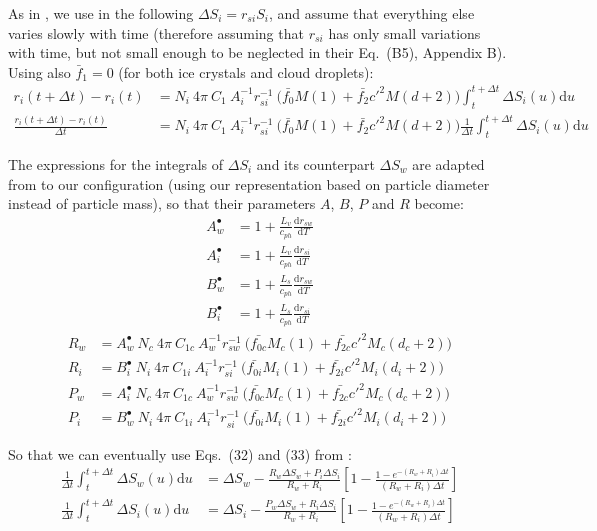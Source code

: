 As in \citet{Reisin1996}, we use in the following $\Delta S_i = r_{si} S_i$, and assume that everything else varies slowly with time (therefore assuming that $r_{si}$ has only small variations with time, but not small enough to be neglected in their Eq.\ (B5), Appendix B). Using also $\bar{f}_1=0$ (for both ice crystals and cloud droplets):
\begin{align}
 r_i(t + \Delta t) - r_i(t) &= N_i ~ 4\pi ~ C_1 ~ A_i^{-1} r_{si}^{-1} ~ \Bigg( \bar{f_0} M(1) + \bar{f_2} c'^2 M(d+2) \Bigg) \int_t^{t + \Delta t} \Delta S_i(u) \mathrm{d}u \\
 \frac{r_i(t + \Delta t) - r_i(t)}{\Delta t} &= N_i ~ 4\pi ~ C_1 ~ A_i^{-1} r_{si}^{-1} ~ \Bigg( \bar{f_0} M(1) + \bar{f_2} c'^2 M(d+2) \Bigg) \frac{1}{\Delta t} \int_t^{t + \Delta t} \Delta S_i(u) \mathrm{d}u \label{update-ri}
\end{align}

The expressions for the integrals of $\Delta S_i$ and its counterpart $\Delta S_w$ are adapted from \citet{Reisin1996} to our configuration (using our representation based on particle diameter instead of particle mass), so that their parameters $A$, $B$, $P$ and $R$ become:
\begin{align}
 A_w^\bullet &= 1 + \frac{L_v}{c_{ph}} \frac{\mathrm{d}r_{sw}}{\mathrm{d}T} \\
 A_i^\bullet &= 1 + \frac{L_v}{c_{ph}} \frac{\mathrm{d}r_{si}}{\mathrm{d}T} \\
 B_w^\bullet &= 1 + \frac{L_s}{c_{ph}} \frac{\mathrm{d}r_{sw}}{\mathrm{d}T} \\
 B_i^\bullet &= 1 + \frac{L_s}{c_{ph}} \frac{\mathrm{d}r_{si}}{\mathrm{d}T}
\end{align}
\begin{align}
 R_w &= A_w^\bullet ~ N_c ~ 4\pi ~ C_{1c} ~ A_w^{-1} r_{sw}^{-1} ~ \Bigg( \bar{f_{0c}} M_c(1) + \bar{f_{2c}} c'^2 M_c(d_c+2) \Bigg) \\
 R_i &= B_i^\bullet ~ N_i ~ 4\pi ~ C_{1i} ~ A_i^{-1} r_{si}^{-1} ~ \Bigg( \bar{f_{0i}} M_i(1) + \bar{f_{2i}} c'^2 M_i(d_i+2) \Bigg) \\
 P_w &= A_i^\bullet ~ N_c ~ 4\pi ~ C_{1c} ~ A_w^{-1} r_{sw}^{-1} ~ \Bigg( \bar{f_{0c}} M_c(1) + \bar{f_{2c}} c'^2 M_c(d_c+2) \Bigg) \\
 P_i &= B_w^\bullet ~ N_i ~ 4\pi ~ C_{1i} ~ A_i^{-1} r_{si}^{-1} ~ \Bigg( \bar{f_{0i}} M_i(1) + \bar{f_{2i}} c'^2 M_i(d_i+2) \Bigg) 
\end{align}

So that we can eventually use Eqs.\ (32) and (33) from \citet{Reisin1996}:
\begin{align}
 \frac{1}{\Delta t} \int_t^{t + \Delta t} \Delta S_w(u) \mathrm{d}u &= \Delta S_w - \frac{R_w \Delta S_w + P_i \Delta S_i}{R_w + R_i} \left[ 1 - \frac{1 - e^{-(R_w + R_i)\Delta t}}{(R_w + R_i)\Delta t} \right] \\
 \frac{1}{\Delta t} \int_t^{t + \Delta t} \Delta S_i(u) \mathrm{d}u &= \Delta S_i - \frac{P_w \Delta S_w + R_i \Delta S_i}{R_w + R_i} \left[ 1 - \frac{1 - e^{-(R_w + R_i)\Delta t}}{(R_w + R_i)\Delta t} \right] \label{DeltaSi}
\end{align}

